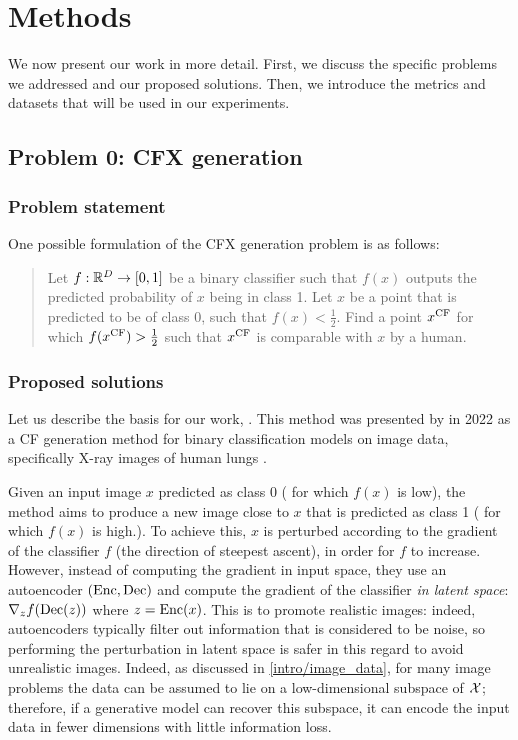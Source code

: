 \documentclass[../main.tex]{subfiles}
\begin{document}
\chapter{Methods}
\label{ch:methods}

We now present our work in more detail.
First, we discuss the specific problems we addressed and our proposed solutions.
Then, we introduce the metrics and datasets that will be used in our experiments.

\section{Problem 0: CFX generation}

\subsection{Problem statement}

One possible formulation of the CFX generation problem is as follows:
\begin{quote}
Let $f: \mathbb{R}^D \to [0, 1]$ be a binary classifier such that $f(x)$ outputs the predicted probability of $x$ being in class 1.
Let $x$ be a point that is predicted to be of class 0, \ie{} such that $f(x) < \frac{1}{2}$.
Find a point $x^\mathrm{CF}$ for which $f(x^\mathrm{CF}) > \frac{1}{2}$ such that $x^\mathrm{CF}$ is comparable with $x$ by a human.
\end{quote}

\subsection{Proposed solutions}
\label{methods:0_sols}

Let us describe the basis for our work, \ls{}.
This method was presented by \citeauthor{cohenGifsplanation2022} in 2022 as a CF generation method for binary classification models on image data, specifically X-ray images of human lungs \cite{cohenGifsplanation2022}.

Given an input image $x$ predicted as class 0 (\ie{} for which $f(x)$ is low), the method aims to produce a new image close to $x$ that is predicted as class 1 (\ie{} for which $f(x)$ is high.).
To achieve this, $x$ is perturbed according to the gradient of the classifier $f$ (the direction of steepest ascent), in order for $f$ to increase.
However, instead of computing the gradient in input space, they use an autoencoder $(\operatorname{Enc}, \operatorname{Dec})$ and compute the gradient of the classifier \emph{in latent space}: $\nabla_z f(\operatorname{Dec}(z))$ where $z = \operatorname{Enc}(x)$.
This is to promote realistic images: indeed, autoencoders typically filter out information that is considered to be noise, so performing the perturbation in latent space is safer in this regard to avoid unrealistic images.
Indeed, as discussed in \autoref{intro/image_data}, for many image problems the data can be assumed to lie on a low-dimensional subspace of $\mathcal{X}$; therefore, if a generative model can recover this subspace, it can encode the input data in fewer dimensions with little information loss.
\end{document}
